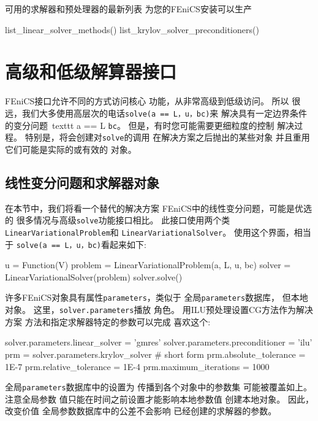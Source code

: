 \noindent
可用的求解器和预处理器的最新列表
为您的FEniCS安装可以生产

\begin{python}
list_linear_solver_methods()
list_krylov_solver_preconditioners()
\end{python}

\section{高级和低级解算器接口}

FEniCS接口允许不同的方式访问核心
功能，从非常高级到低级访问。 所以
很远，我们大多使用高层次的电话\texttt{solve(a == L，u，bc)}来
解决具有一定边界条件的变分问题\ texttt {a == L}
\texttt{bc}。 但是，有时您可能需要更细粒度的控制
解决过程。 特别是，将会创建对\texttt{solve}的调用
在解决方案之后抛出的某些对象
并且重用它们可能是实际的或有效的
对象。

\subsection{线性变分问题和求解器对象}
\label{ch:poisson0:solver:problem}

在本节中，我们将看一个替代的解决方案
FEniCS中的线性变分问题，可能是优选的
很多情况与高级\texttt{solve}功能接口相比。
此接口使用两个类\texttt{LinearVariationalProblem}和
\texttt{LinearVariationalSolver}。 使用这个界面，相当于
\texttt{solve(a == L，u，bc)}看起来如下:

\begin{python}
u = Function(V)
problem = LinearVariationalProblem(a, L, u, bc)
solver = LinearVariationalSolver(problem)
solver.solve()
\end{python}

许多FEniCS对象具有属性\texttt{parameters}，类似于
全局\texttt{parameters}数据库，
但本地对象。 这里，\texttt{solver.parameters}播放
角色。 用ILU预处理设置CG方法作为解决方案
方法和指定求解器特定的参数可以完成
喜欢这个:

\begin{python}
solver.parameters.linear_solver = 'gmres'
solver.parameters.preconditioner = 'ilu'
prm = solver.parameters.krylov_solver  # short form
prm.absolute_tolerance = 1E-7
prm.relative_tolerance = 1E-4
prm.maximum_iterations = 1000
\end{python}
全局\texttt{parameters}数据库中的设置为
传播到各个对象中的参数集
可能被覆盖如上。 注意全局参数
值只能在时间之前设置才能影响本地参数值
创建本地对象。 因此，改变价值
全局参数数据库中的公差不会影响
已经创建的求解器的参数。

